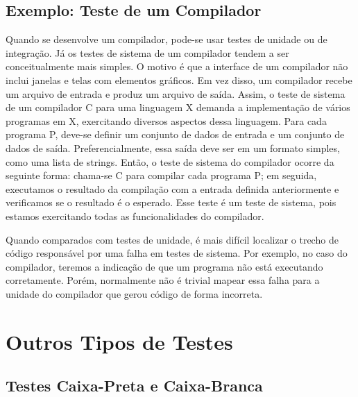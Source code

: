 \documentclass[
  11pt,
  twoside]{book}
\begin{document}
\hypertarget{exemplo-teste-de-um-compilador}{%
\subsection{Exemplo: Teste de um
Compilador}\label{exemplo-teste-de-um-compilador}}

Quando se desenvolve um compilador, pode-se usar testes de unidade ou de
integração. Já os testes de sistema de um compilador tendem a ser
conceitualmente mais simples. O motivo é que a interface de um
compilador não inclui janelas e telas com elementos gráficos. Em vez
disso, um compilador recebe um arquivo de entrada e produz um arquivo de
saída. Assim, o teste de sistema de um compilador C para uma linguagem X
demanda a implementação de vários programas em X, exercitando diversos
aspectos dessa linguagem. Para cada programa P, deve-se definir um
conjunto de dados de entrada e um conjunto de dados de saída.
Preferencialmente, essa saída deve ser em um formato simples, como uma
lista de strings. Então, o teste de sistema do compilador ocorre da
seguinte forma: chama-se C para compilar cada programa P; em seguida,
executamos o resultado da compilação com a entrada definida
anteriormente e verificamos se o resultado é o esperado. Esse teste é um
teste de sistema, pois estamos exercitando todas as funcionalidades do
compilador.

Quando comparados com testes de unidade, é mais difícil localizar o
trecho de código responsável por uma falha em testes de sistema. Por
exemplo, no caso do compilador, teremos a indicação de que um programa
não está executando corretamente. Porém, normalmente não é trivial
mapear essa falha para a unidade do compilador que gerou código de forma
incorreta.

\hypertarget{outros-tipos-de-testes}{%
\section{Outros Tipos de Testes}\label{outros-tipos-de-testes}}

\hypertarget{testes-caixa-preta-e-caixa-branca}{%
\subsection{Testes Caixa-Preta e
Caixa-Branca}\label{testes-caixa-preta-e-caixa-branca}}

\end{document}
